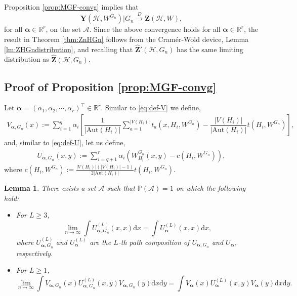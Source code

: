 \documentclass[11pt,reqno]{amsart}
\numberwithin{equation}{section}
\newcommand{\R}{{\mathbb R}}
\newtheorem{lemma}{Lemma}[section]
\theoremstyle{definition}
\begin{document}
Proposition \ref{prop:MGF-convg} implies that 
$$ \bm{Y}(\mathcal{H},W^{G_{n}})|G_n \stackrel {D} \rightarrow \bm{Z}(\mathcal{H},W), $$
for all $\bm{\alpha} \in \R^r$, on the set $\mathcal A$. Since the above convergence  holds for all $\bm{\alpha} \in \R^r$, the result in Theorem \ref{thm:ZnHGn} follows from the Cram\'er-Wold device, Lemma \ref{lm:ZHGndistribution}, and recalling that $\hat{\bm Z}'( \mathcal{H}, G_{n})$ has the same limiting distribution as $\hat{\bm Z}( \mathcal{H}, G_{n})$. 


\subsection{Proof of Proposition \ref{prop:MGF-convg} }
\label{sec:mgfWGnpf}


Let $\bm \alpha = (\alpha_{1},\alpha_{2},\cdots,\alpha_{r})^\top \in\mathbb{R}^r$. Similar to \eqref{eq:def-V} we define,
\begin{align}\label{eq:def-Vn}
    V_{\bm \alpha, G_n}(x) := \sum_{i=1}^{q}\alpha_{i}\left[\dfrac{1}{\left|\text{Aut}(H_{i})\right|}\sum_{a=1}^{|V(H_{i})|}t_{a}(x,H_{i},W^{G_{n}}) - \dfrac{|V(H_{i})|}{\left|\text{Aut}(H_{i})\right|}t(H_{i},W^{G_{n}})\right] , 
\end{align}
and, similar to \eqref{eq:def-U}, let us define, 
\begin{align}\label{eq:def-Un}
    U_{\bm \alpha, G_n}(x, y) := \sum_{i=q+1}^{r}\alpha_{i}\left(W^{G_n}_{H_{i}} (x, y)  - c(H_{i},W^{G_{n}})\right) , 
\end{align}
where $c(H_{i},W^{G_{n}}):= \frac{|V(H_{i})|(|V(H_{i})| -1) }{2|\text{Aut}(H_{i})|}t(H_{i},W^{G_{n}})$. 

\begin{lemma}\label{lemma:Unl-convg}
There exists a set $\mathcal{A}$ such that $\mathbb P(\mathcal{A}) = 1$ on which  
the following hold:
\begin{itemize}
 \item[$(1)$] For $L \geq 3$, 
 $$\lim_{n \rightarrow \infty} \int U_{\bm \alpha, G_n}^{(L)}(x, x) \mathrm{d}x = \int U_{\bm \alpha}^{(L)}(x,x)\mathrm{d}x,$$
where $U_{\bm \alpha, G_n}^{(L)}$ and $U_{\bm \alpha}^{(L)}$ are the $L$-th path composition of $U_{\bm \alpha, G_n}$ and $U_{\bm \alpha}$, respectively. 

\item[$(2)$] For $L \geq 1$, 
 $$\lim_{n \rightarrow \infty} \int V_{\bm \alpha, G_n}(x) U_{\bm \alpha, G_n}^{(L)}(x, y) V_{\bm \alpha, G_n}(y) \mathrm{d}x \mathrm {d} y = \int V_{\bm \alpha}(x) U_{\bm \alpha}^{(L)}(x, y) V_{\bm \alpha}(y) \mathrm{d}x \mathrm {d} y . $$

\end{itemize} 
\end{lemma}
\end{document}
